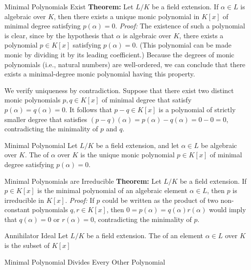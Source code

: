 \begin{thmbox}{Minimal Polynomials Exist}
	\textbf{Theorem:} Let $L/K$ be a field extension. If $\alpha \in L$ is algebraic over $K$, then there exists a unique monic polynomial in $K[x]$ of minimal degree satisfying $p(\alpha) = 0$.
\tcblower
	\textit{Proof:} The existence of such a polynomial is clear, since by the hypothesis that $\alpha$ is algebraic over $K$, there exists a polynomial $p \in K[x]$ satisfying $p(\alpha) = 0$. (This polynomial can be made monic by dividing it by its leading coefficient.) Because the degrees of monic polynomials (i.e., natural numbers) are well-ordered, we can conclude that there exists a minimal-degree monic polynomial having this property.

	We verify uniqueness by contradiction. Suppose that there exist two distinct monic polynomials $p, q \in K[x]$ of minimal degree that satisfy $p(\alpha) = q(\alpha) = 0$. It follows that $p-q \in K[x]$ is a polynomial of strictly smaller degree that satisfies $(p-q)(\alpha) = p(\alpha) - q(\alpha) = 0 - 0 = 0$, contradicting the minimality of $p$ and $q$.
\end{thmbox}

\begin{dfnbox}{Minimal Polynomial}
	Let $L/K$ be a field extension, and let $\alpha \in L$ be algebraic over $K$. The  of $\alpha$ over $K$ is the unique monic polynomial $p \in K[x]$ of minimal degree satisfying $p(\alpha) = 0$.
\end{dfnbox}

\begin{thmbox}{Minimal Polynomials are Irreducible}
	\textbf{Theorem:} Let $L/K$ be a field extension. If $p \in K[x]$ is the minimal polynomial of an algebraic element $\alpha \in L$, then $p$ is irreducible in $K[x]$.
\tcblower
	\textit{Proof:} If $p$ could be written as the product of two non-constant polynomials $q, r \in K[x]$, then $0 = p(\alpha) = q(\alpha) r(\alpha)$ would imply that $q(\alpha) = 0$ or $r(\alpha) = 0$, contradicting the minimality of $p$.
\end{thmbox}

\begin{dfnbox}{Annihilator Ideal}
	Let $L/K$ be a field extension. The  of an element $\alpha \in L$ over $K$ is the subset of $K[x]$
\end{dfnbox}

\begin{thmbox}{Minimal Polynomial Divides Every Other Polynomial}
\end{thmbox}

